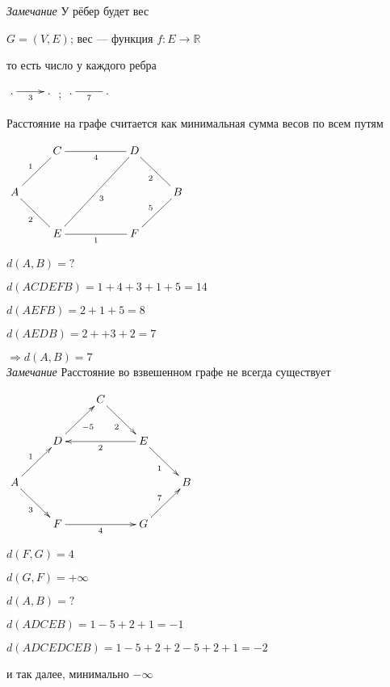 \documentclass[a4paper, 12pt] {article}
\begin{document}
\textit{Замечание} У рёбер будет вес

$ G=(V, E) $; вес --- функция $ f: E \rightarrow \mathbb R $

то есть число у каждого ребра 

$ \begin{matrix}
	\xymatrix{
		. \ar@{->}[r]_3  & . \\
	}
\end{matrix} $ ;
$ \begin{matrix}
	\xymatrix{
		. \ar@{-}[r]_7  & . \\
	}
\end{matrix} $

Расстояние на графе считается как минимальная сумма весов по всем путям

$ \begin{matrix}
	\xymatrix{
		& C \ar@{-}[rr]_4 \ar@{-}[ld]_1 & & D \ar@{-}[rd]_2 \\
		A \ar@{-}[rd]_2 & & & & B \ar@{-}[ld]_5 \\
		& E \ar@{-}[rr]_1 \ar@{-}[rruu]_3 & & F  \\
	}
\end{matrix} $

$  d(A, B) = ? $

$ d(ACDEFB)=1+4+3+1+5=14 $

$ d(AEFB)=2+1+5=8 $

$ d(AEDB)=2++3+2=7 $

$ \Rightarrow d(A, B) =7 $\\

\textit{Замечание} Расстояние во взвешенном графе не всегда существует

$ \begin{matrix}
	\xymatrix{
        & & C \ar@{->}[rd]_{2} & &	\\
		& D \ar@{<-}[rr]_2 \ar@{->}[ru]_{-5} \ar@{<-}[ld]_1 & & E \ar@{->}[rd]_1 \\
		A \ar@{->}[rd]_3 & & & & B \ar@{<-}[ld]_7 \\
		& F \ar@{->}[rr]_4  & & G  \\
	}
\end{matrix} $

$  d(F, G) =4 $

$  d(G, F) =+ \infty $

$  d(A, B) = ? $

$  d(ADCEB) = 1-5+2+1 =-1 $

$  d(ADCEDCEB) = 1-5+2+2-5+2+1 =-2 $ 

и так далее, минимально $ -\infty $
\end{document}
